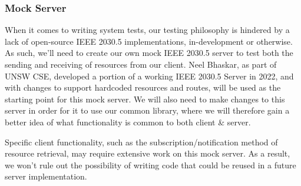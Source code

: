 \subsubsection{Mock Server}

When it comes to writing system tests, our testing philosophy is hindered by a lack of open-source IEEE 2030.5 implementations, in-development or otherwise.
As such, we'll need to create our own mock IEEE 2030.5 server to test both the sending and receiving of resources from our client.
Neel Bhaskar, as part of UNSW CSE, developed a portion of a working IEEE 2030.5 Server in 2022, and with changes to support hardcoded resources and routes, will be used as the starting point for this mock server.
We will also need to make changes to this server in order for it to use our common library, where we will therefore gain a better idea of what functionality is common to both client \& server.

Specific client functionality, such as the subscription/notification method of resource retrieval, may require extensive work on this mock server. 
As a result, we won't rule out the possibility of writing code that could be reused in a future server implementation.









